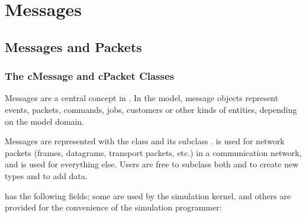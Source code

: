 \chapter{Messages}
\label{cha:messages}

\section{Messages and Packets}

\subsection{The cMessage and cPacket Classes}

Messages are a central concept in {\opp}. In the model, message objects
represent events, packets, commands, jobs, customers or other kinds of
entities, depending on the model domain.

Messages are represented with the  class and its subclass
.  is used for network packets (frames,
datagrams, transport packets, etc.) in a communication network, and
 is used for everything else. Users are free to subclass
both  and  to create new types and to
add data.

 has the following fields; some are used by
the simulation kernel, and others are provided for the convenience
of the simulation programmer:


